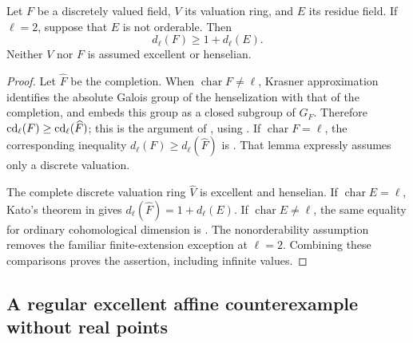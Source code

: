 \begin{lemma}
\label{A:valuation-lower}
Let $F$ be a discretely valued field, $V$ its valuation ring, and $E$ its residue field. If $\ell=2$, suppose that $E$ is not orderable. Then
\[
d_\ell(F)\geq1+d_\ell(E).
\]
Neither $V$ nor $F$ is assumed excellent or henselian.
\end{lemma}
\begin{proof}
Let $\widehat F$ be the completion. When $\operatorname{char}F\neq\ell$, Krasner approximation identifies the absolute Galois group of the henselization with that of the completion, and embeds this group as a closed subgroup of $G_F$. Therefore $\operatorname{cd}_\ell(F)\geq\operatorname{cd}_\ell(\widehat F)$; this is the argument of \citet[\S3.2]{A_GO2008}, using \citet[Exposé X, Lemme 2.2.1]{A_SGA4}. If $\operatorname{char}F=\ell$, the corresponding inequality $d_\ell(F)\geq d_\ell(\widehat F)$ is \citet[\S3.3, the displayed lemma]{A_GO2008}. That lemma expressly assumes only a discrete valuation.

The complete discrete valuation ring $\widehat V$ is excellent and henselian. If $\operatorname{char}E=\ell$, Kato's theorem in \citet[\S2.3, Théorème 2.3.1]{A_GO2008} gives
$d_\ell(\widehat F)=1+d_\ell(E)$. If $\operatorname{char}E\neq\ell$, the same equality for ordinary cohomological dimension is \citet[Exposé X, Théorème 2.2(i)]{A_SGA4}. The nonorderability assumption removes the familiar finite-extension exception at $\ell=2$. Combining these comparisons proves the assertion, including infinite values.
\end{proof}

\subsection{A regular excellent affine counterexample without real points}

